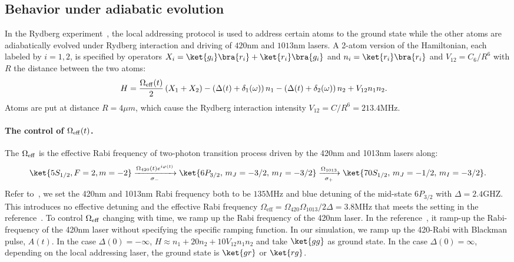 \documentclass[aps,%
onecolumn,%
floatfix,%
pra,%
amsfonts,%
longbibliography,%
groupedaddress,%
superscriptaddress]{revtex4-2}%
\newcommand{\1}{\mathbbm{1}}
\begin{document}
\subsection{Behavior under adiabatic evolution}

In the Rydberg experiment~\cite{manovitz2025quantum}, the local addressing protocol is used to address certain atoms to the ground state while the other atoms are adiabatically evolved under Rydberg interaction and driving of $420 \mathrm{nm}$ and $1013 \mathrm{nm}$ lasers. 
A 2-atom version of the Hamiltonian, each labeled by $i =1,2$, is specified by operators $X_i = \ket{g_i}\bra{r_i} + \ket{r_i}\bra{g_i}$ and $n_i = \ket{r_i}\bra{r_i}$ and $V_{12} = C_6/R^6$ with $R$ the distance between the two atoms:
\begin{align*}
    H &= \frac{\Omega_{\rm eff}(t)}{2} \left(X_1 + X_2 \right) - \left( \Delta(t) + \delta_1(\omega) \right) n_1 - \left( \Delta(t) + \delta_2(\omega) \right) n_2 + V_{12} n_1 n_2.
\end{align*}
Atoms are put at distance $R = 4 \mu m$, which cause the Rydberg interaction intensity $V_{12} = C/R^6 = 213.4 \mathrm{MHz}$.

\paragraph*{The control of $\Omega_{\rm eff}(t)$.}
The $\Omega_{\rm eff}$ is the effective Rabi frequency of two-photon transition process driven by the 420nm and 1013nm lasers along:
\begin{align*}
    \ket{5S_{1/2}, F = 2, m = -2} \xrightarrow[\sigma_{-}]{\Omega_{\rm 420}(t) e^{i \varphi(t)}} \ket{6P_{3/2},\, m_J = -3/2,\, m_I = -3/2} \xrightarrow[\sigma_{+}]{\Omega_{\rm 1013}} \ket{70S_{1/2},\, m_J = -1/2,\, m_I = -3/2}.
\end{align*}
Refer to~\cite{manovitz2025quantum}, we set the 420nm and 1013nm Rabi frequency both to be $135 \mathrm{MHz}$ and blue detuning of the mid-state $6P_{3/2}$ with $\Delta = 2.4 \mathrm{GHZ}$.
This introduces no effective detuning and the effective Rabi frequency $\Omega_{\text{eff}} = {\Omega_{420} \Omega_{1013}}/{2\Delta} = 3.8 \mathrm{MHz}$ that meets the setting in the reference~\cite{manovitz2025quantum}.
To control $\Omega_{\rm eff}$ changing with time, we ramp up the Rabi frequency of the 420nm laser.
In the reference~\cite{manovitz2025quantum}, it ramp-up the Rabi-frequency of the 420nm laser without specifying the specific ramping function.
In our simulation, we ramp up the 420-Rabi with Blackman pulse, $A(t)$.
In the case $\Delta(0) = -\infty$, $H \approx n_1 + 20n_2 + 10 V_{12} n_1 n_2 $ and take $\ket{gg}$ as ground state. In the case $\Delta(0) = \infty$, depending on the local addressing laser, the ground state is $\ket{gr}$ or $\ket{rg}$.
\end{document}
